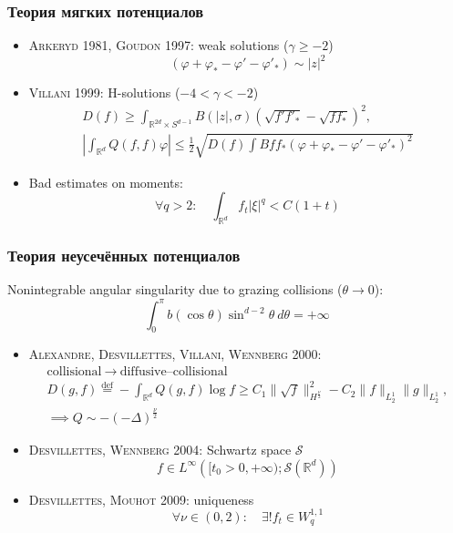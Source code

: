 \documentclass[mathserif]{beamer} %
\newcommand{\eqdef}{\overset{\mathrm{def}}{=}}
\newcommand{\dd}{\:d}%
\newcommand{\Cite}[2][]{\alert{\textsc{#2 #1}}}
\renewcommand{\phi}{\varphi}
\begin{document}
\begin{frame}
    \frametitle{Теория мягких потенциалов}
    \begin{itemize}
        \item \Cite[1981]{Arkeryd}, \Cite[1997]{Goudon}: weak solutions (\(\gamma\geq-2\))
        \[ (\phi + \phi_* - \phi' - \phi'_*) \sim |z|^2 \]
        \item \Cite[1999]{Villani}: H-solutions (\(-4<\gamma<-2\))
        \begin{gather*}
            D(f) \geq \int_{\mathbb{R}^{2d}\times S^{d-1}} B(|z|, \sigma) \left(\sqrt{f'f'_*} - \sqrt{ff_*}\right)^2, \\
            \left| \int_{\mathbb{R}^d} Q(f,f)\phi \right| \leq \frac12
            \sqrt{ D(f) \int Bff_* (\phi + \phi_* - \phi' - \phi'_*)^2 }
        \end{gather*}
        \item Bad estimates on moments:
        \[ \forall q>2: \quad\int_{\mathbb{R}^d} f_t |\xi|^q < C(1+t) \]
    \end{itemize}
\end{frame}

\begin{frame}
    \frametitle{Теория неусечённых потенциалов}
    Nonintegrable angular singularity due to grazing collisions (\(\theta\to0\)):
    \[ \int_0^\pi b(\cos\theta)\sin^{d-2}\theta\dd\theta = +\infty \]
    \vspace{-20pt}
    \begin{itemize}
        \item \Cite[2000]{Alexandre, Desvillettes, Villani, Wennberg}:
        \begin{gather*}
            \text{collisional} \:\longrightarrow\: \text{diffusive--collisional} \\
            D(g,f) \eqdef -\int_{\mathbb{R}^d} Q(g,f)\log{f} \geq C_1\|\sqrt{f}\|^2_{H^\frac\nu2} - C_2\|f\|_{L^1_2}\|g\|_{L^1_2}, \\
            \implies Q \sim -(-\Delta)^\frac\nu2 %
        \end{gather*}
        \item \Cite[2004]{Desvillettes, Wennberg}: Schwartz space \(\mathscr{S}\)
        \[ f \in L^\infty\left([t_0>0,+\infty); \mathscr{S}(\mathbb{R}^d)\right) \]
        \item \Cite[2009]{Desvillettes, Mouhot}: uniqueness
        \[ \forall\nu\in(0,2): \quad\exists! f_t\in W_q^{1,1} \]
    \end{itemize}
\end{frame}
\end{document}
